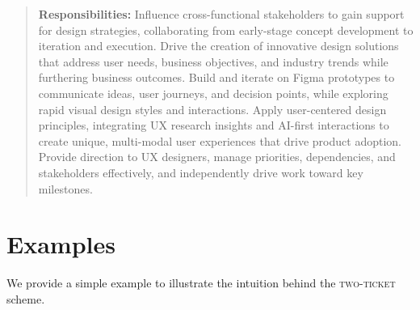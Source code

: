 \begin{quote}
    \textbf{Responsibilities:}
    Influence cross-functional stakeholders to gain support for design strategies, collaborating from early-stage concept development to iteration and execution.
    Drive the creation of innovative design solutions that address user needs, business objectives, and industry trends while furthering business outcomes.
    Build and iterate on Figma prototypes to communicate ideas, user journeys, and decision points, while exploring rapid visual design styles and interactions.
    Apply user-centered design principles, integrating UX research insights and AI-first interactions to create unique, multi-modal user experiences that drive product adoption.
    Provide direction to UX designers, manage priorities, dependencies, and stakeholders effectively, and independently drive work toward key milestones.
\end{quote}

\section{Examples}
    We provide a simple example to illustrate the intuition behind the \textsc{two-ticket} scheme.

